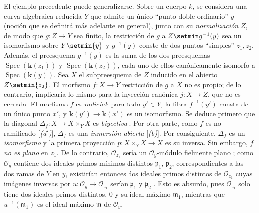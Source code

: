 \begin{env}[11.7.3]
\label{IV.11.7.3}
El ejemplo precedente puede generalizarse. Sobre un cuerpo $k$, se considera una curva algebraica reducida $Y$ que admite un único ``punto doble ordinario'' $y$ (noción que se definirá más adelante en general), junto con su \emph{normalización} $Z$, de modo que $g:Z\to Y$ sea finito, la restricción de $g$ a $Z\setmin g^{-1}(y)$ sea un isomorfismo sobre $Y\setmin\{y\}$ y $g^{-1}(y)$ conste de dos puntos ``simples'' $z_1,z_2$. Además, el preesquema $g^{-1}(y)$ es la suma de los dos preesquemas $\operatorname{Spec}(\boldsymbol{k}(z_1))$ y $\operatorname{Spec}(\boldsymbol{k}(z_2))$, cada uno de ellos canónicamente isomorfo a $\operatorname{Spec}(\boldsymbol{k}(y))$.
Sea $X$ el subpreesquema de $Z$ inducido en el abierto $Z\setmin\{z_2\}$. El morfismo $f:X\to Y$ restricción de $g$ a $X$ no es propio; de lo contrario,  implicaría lo mismo para la inyección canónica $j:X\to Z$, que no es cerrada.
El morfismo $f$ es \emph{radicial}: para todo $y'\in Y$, la fibra $f^{-1}(y')$ consta de un único punto $x'$, y $\boldsymbol{k}(y')\to\boldsymbol{k}(x')$ es un isomorfismo. Se deduce primero que la diagonal $\Delta_f:X\to X\times_Y X$ es \emph{biyectiva} . Por otra parte, como $f$ es no ramificado [\emph{(d$'$)}], $\Delta_f$ es una \emph{inmersión abierta} [\emph{(b)}]. Por consiguiente, $\Delta_f$ es un \emph{isomorfismo} y la primera proyección $p:X\times_Y X\to X$ es su inversa.
Sin embargo, $f$ \emph{no es plano} en $z_1$. De lo contrario, $\mathcal O_{z_1}$ sería un $\mathcal O_y$-módulo fielmente plano ; como $\mathcal O_y$ contiene dos ideales primos mínimos distintos $\mathfrak p_1$,
$\mathfrak p_2$, correspondientes a las dos ramas de $Y$ en $y$, existirían entonces dos ideales primos distintos de $\mathcal O_{z_1}$ cuyas imágenes inversas por $u:\mathcal O_y\to\mathcal O_{z_1}$ serían $\mathfrak p_1$ y $\mathfrak p_2$ . Esto es absurdo, pues $\mathcal O_{z_1}$ solo tiene dos ideales primos distintos, $0$ y su ideal máximo $\mathfrak m_1$, mientras que $u^{-1}(\mathfrak m_1)$ es el ideal máximo $\mathfrak m$ de $\mathcal O_y$.
\end{env}

